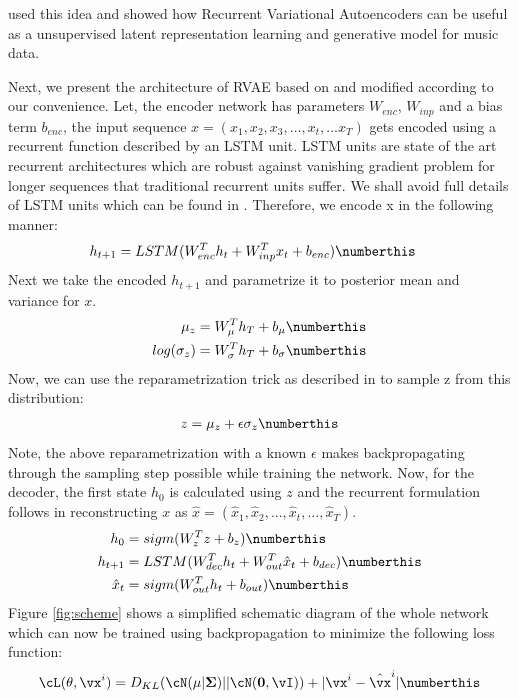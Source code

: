 \cite{Fabius2015} used this idea and showed how Recurrent Variational Autoencoders can be
 useful as a unsupervised latent representation learning and generative model for
music data. 

Next, we present the architecture of RVAE based on \cite{Fabius2015} and modified according to our convenience.  Let, the encoder network has parameters $W_{enc}$, $W_{inp}$ and a bias term $b_{enc}$, the input sequence $x = (x_1,x_2,x_3,...,x_t,...x_T)$ gets encoded using a recurrent function  described by an LSTM unit. LSTM units are state of the art recurrent architectures which are robust against vanishing gradient problem for longer sequences that traditional recurrent units suffer. We shall avoid  full details of LSTM units which can be found in \cite{Hochreiter1997}. Therefore, we encode x in the following manner:
\begin{align*}
 h_{t+1} &= LSTM(W_{enc}^Th_t + W_{inp}^T{x_t}+b_{enc}) \numberthis \label{lstm}
\end{align*}
 Next we take the encoded $h_{t+1}$ and parametrize it to posterior mean and variance for $x$.
\begin{align*}
 \mu_z &= W_{\mu}^Th_T + b_{\mu} \numberthis \label{mu}\\
  log(\sigma_z) &= W_{\sigma}^Th_T + b_{\sigma} \numberthis \label{sigma}
\end{align*}
Now, we can use the reparametrization trick as described in \cite{Kingma2014} to sample z from this distribution:
\begin{align*}
 z = \mu_z + \epsilon\sigma_z \numberthis 
\end{align*}
Note, the above reparametrization with a known $\epsilon$ makes backpropagating through the sampling step possible while training the network. Now, for the decoder, the first state $h_0$ is calculated using $z$ and the recurrent formulation follows in reconstructing $x$ as $\hat{x} = (\hat{x}_1,\hat{x}_2,...,\hat{x}_t,...,\hat{x}_T )$.
\begin{align*}
 h_0 &= sigm(W_{z}^Tz + b_{z}) \numberthis  \\
h_{t+1} &= LSTM(W_{dec}^Th_t + W_{out}^T{\hat{x}_t}+b_{dec}) \numberthis \label{decoder_lstm} \\
\hat{x}_t &= sigm(W_{out}^Th_t + b_{out}) \numberthis
\end{align*}
Figure \ref{fig:scheme} shows a simplified schematic diagram of the whole network which can now be trained using backpropagation to minimize the following loss function: 
\begin{align*}
 \cL(\theta,\vx^i) = D_{KL}(\cN(\mathbf{\mu}|\mathbf{\Sigma})||\cN(\mathbf{0},\vI)) + |\vx^i - \hat{\vx}^i| \numberthis \label{lossfunction}
\end{align*}
